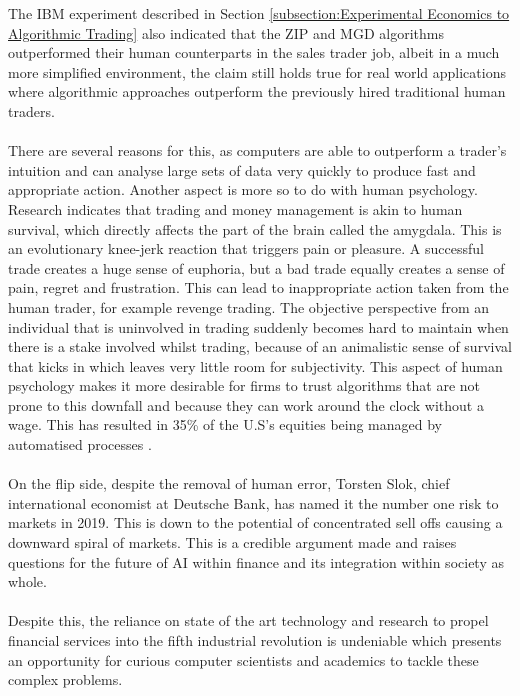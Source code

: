 \documentclass[ %
                    author={Ashwinder Khurana},
                supervisor={Prof Dave Cliff},
                    degree={MEng},
                     title={The Deeply Reinforced Trader},
                  subtitle={},
                      type={enterprise},
                      year={2020} ]{dissertation}
\begin{document}
The IBM experiment described in Section \ref{subsection:Experimental Economics to Algorithmic Trading} also indicated that the ZIP and MGD algorithms outperformed their human counterparts in the sales trader job, albeit in a much more simplified environment, the claim still holds true for real world applications where algorithmic approaches outperform the previously hired traditional human traders. 
\\
\\
There are several reasons for this, as computers are able to outperform a trader's intuition and can analyse large sets of data very quickly to produce fast and appropriate action. Another aspect is more so to do with human psychology. 
Research indicates \cite{quora-trading-hard} that trading and money management is akin to human survival, which directly affects the part of the brain called the amygdala. This is an evolutionary knee-jerk reaction that triggers pain or pleasure. A successful trade creates a huge sense of euphoria, but a bad trade equally creates a sense of pain, regret and frustration. This can lead to inappropriate action taken from the human trader, for example revenge trading. The objective perspective from an individual that is uninvolved in trading suddenly becomes hard to maintain when there is a stake involved whilst trading, because of an animalistic sense of survival that kicks in which leaves very little room for subjectivity. This aspect of human psychology makes it more desirable for firms to trust algorithms that are not prone to this downfall and because they can work around the clock without a wage. This has resulted in 35\% of the U.S's equities being managed by automatised processes \cite{computers-trade-more}. 
\\
\\
On the flip side, despite the removal of human error, Torsten Slok, chief international economist at Deutsche Bank, has named it the number one risk to markets in 2019\cite{computers-trade-more}. This is down to the potential of concentrated sell offs causing a downward spiral of markets. This is a credible argument made and raises questions for the future of AI within finance and its integration within society as whole.
\\
\\
Despite this, the reliance on state of the art technology and research to propel financial services into the fifth industrial revolution is undeniable which presents an opportunity for curious computer scientists and academics to tackle these complex problems. 
\end{document}
